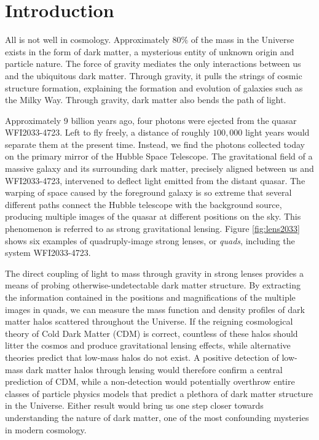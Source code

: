 
%
%

\chapter{Introduction}

\indent All is not well in cosmology. Approximately $80\%$ of the mass in the Universe exists in the form of dark matter, a mysterious entity of unknown origin and particle nature. The force of gravity mediates the only interactions between us and the ubiquitous dark matter. Through gravity, it pulls the strings of cosmic structure formation, explaining the formation and evolution of galaxies such as the Milky Way. Through gravity, dark matter also bends the path of light. 

Approximately 9 billion years ago, four photons were ejected from the quasar WFI2033-4723. Left to fly freely, a distance of roughly $100,000$ light years would separate them at the present time. Instead, we find the photons collected today on the primary mirror of the Hubble Space Telescope. The gravitational field of a massive galaxy and its surrounding dark matter, precisely aligned between us and WFI2033-4723, intervened to deflect light emitted from the distant quasar. The warping of space caused by the foreground galaxy is so extreme that several different paths connect the Hubble telescope with the background source, producing multiple images of the quasar at different positions on the sky. This phenomenon is referred to as strong gravitational lensing. Figure \ref{fig:lens2033} shows six examples of quadruply-image strong lenses, or \textit{quads}, including the system WFI2033-4723.

The direct coupling of light to mass through gravity in strong lenses provides a means of probing otherwise-undetectable dark matter structure. By extracting the information contained in the positions and magnifications of the multiple images in quads, we can measure the mass function and density profiles of dark matter halos scattered throughout the Universe. If the reigning cosmological theory of Cold Dark Matter (CDM) is correct, countless of these halos should litter the cosmos and produce gravitational lensing effects, while alternative theories predict that low-mass halos do not exist. A positive detection of low-mass dark matter halos through lensing would therefore confirm a central prediction of CDM, while a non-detection would potentially overthrow entire classes of particle physics models that predict a plethora of dark matter structure in the Universe. Either result would bring us one step closer towards understanding the nature of dark matter, one of the most confounding mysteries in modern cosmology. 

